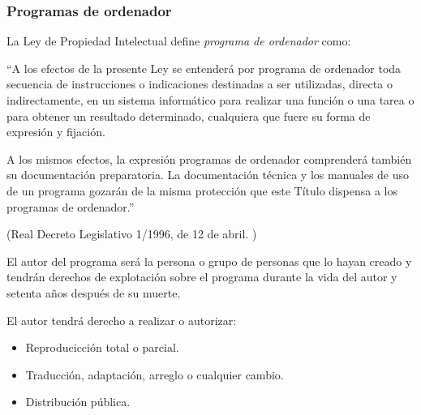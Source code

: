 
            \subsubsection{Programas de ordenador} %
            \label{ssub:ProgramasDeOrdenador}

                La Ley de Propiedad Intelectual define \textit{programa de ordenador} como:

                ``A los efectos de la presente Ley se entenderá por programa de ordenador toda secuencia de
                instrucciones o indicaciones destinadas a ser utilizadas, directa o indirectamente, en un sistema
                informático para realizar una función o una tarea o para obtener un resultado determinado, cualquiera
                que fuere su forma de expresión y fijación.

                A los mismos efectos, la expresión programas de ordenador comprenderá también su documentación
                preparatoria. La documentación técnica y los manuales de uso de un programa gozarán de la misma
                protección que este Título dispensa a los programas de ordenador.''

                \begin{flushright}
                    (Real Decreto Legislativo 1/1996, de 12 de abril. \cite{prop_intelectual})
                \end{flushright}

                El autor del programa será la persona o grupo de personas que lo hayan creado y tendrán derechos de
                explotación sobre el programa durante la vida del autor y setenta años después de su muerte.

                El autor tendrá derecho a realizar o autorizar:

                \begin{itemize}
                    \item Reproducicción total o parcial.
                    \item Traducción, adaptación, arreglo o cualquier cambio.
                    \item Distribución pública.
                \end{itemize}
            
        
    
